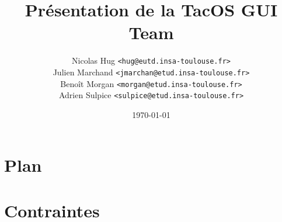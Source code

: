 \documentclass[12pt]{beamer}
\title{Présentation de la TacOS GUI Team}
\author{Nicolas Hug \texttt{<hug@eutd.insa-toulouse.fr>}\\
Julien Marchand \texttt{<jmarchan@etud.insa-toulouse.fr>}\\
Benoît Morgan \texttt{<morgan@etud.insa-toulouse.fr>}\\
Adrien Sulpice \texttt{<sulpice@etud.insa-toulouse.fr>}}
\institute{INSA de Toulouse}
\date{\today}
\begin{document}

\frame{\titlepage}

\section[Plan]{Plan}
\frame{\tableofcontents}

\section{Contraintes}

\end{document}
